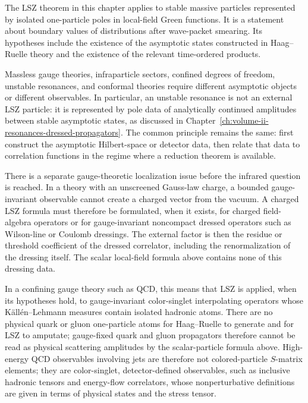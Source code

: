 \begin{remark}
The LSZ theorem in this chapter applies to stable massive particles
represented by isolated one-particle poles in local-field Green functions. It
is a statement about boundary values of distributions after wave-packet
smearing. Its hypotheses include the existence of the asymptotic states
constructed in Haag--Ruelle theory and the existence of the relevant
time-ordered products.

Massless gauge theories, infraparticle sectors, confined degrees of freedom,
unstable resonances, and conformal theories require different asymptotic
objects or different observables.  In particular, an unstable resonance is
not an external LSZ particle: it is represented by pole data of analytically
continued amplitudes between stable asymptotic states, as discussed in
Chapter~\ref{ch:volume-ii-resonances-dressed-propagators}.  The common
principle remains the same: first construct the asymptotic Hilbert-space or
detector data, then relate that data to correlation functions in the regime
where a reduction theorem is available.

There is a separate gauge-theoretic localization issue before the infrared
question is reached.  In a theory with an unscreened Gauss-law charge, a
bounded gauge-invariant observable cannot create a charged vector from the
vacuum.  A charged LSZ formula must therefore be formulated, when it exists,
for charged field-algebra operators or for gauge-invariant noncompact dressed
operators such as Wilson-line or Coulomb dressings.  The external factor is
then the residue or threshold coefficient of the dressed correlator, including
the renormalization of the dressing itself.  The scalar local-field formula
above contains none of this dressing data.

In a confining gauge theory such as QCD, this means that LSZ is applied, when
its hypotheses hold, to gauge-invariant color-singlet interpolating operators
whose K\"all\'en--Lehmann measures contain isolated hadronic atoms.  There are
no physical quark or gluon one-particle atoms for Haag--Ruelle to generate and
for LSZ to amputate; gauge-fixed quark and gluon propagators therefore cannot
be read as physical scattering amplitudes by the scalar-particle formula above.
High-energy QCD observables involving jets are therefore not colored-particle
\(S\)-matrix elements; they are color-singlet, detector-defined observables,
such as inclusive hadronic tensors and energy-flow correlators, whose
nonperturbative definitions are given in terms of physical states and the
stress tensor.
\end{remark}
